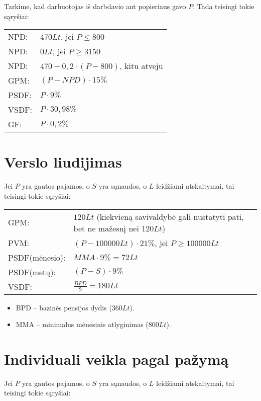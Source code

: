 Tarkime, kad darbuotojas iš darbdavio ant popieriaus gavo $P$. Tada
teisingi tokie sąryšiai:

\begin{tabularx}{15cm}{p{7.5cm}|p{7.5cm}}
  NPD: & $470 Lt$, jei $P \leq 800$ \\
  NPD: & $0 Lt$, jei $P \geq 3150$ \\
  NPD: & $470 - 0,2 \cdot (P - 800)$, kitu atveju \\
  GPM: & $(P - NPD) \cdot 15\%$ \\
  PSDF: & $P \cdot 9\%$ \\
  VSDF: & $P \cdot 30,98\%$ \\
  GF: & $P \cdot 0,2\%$ \\
\end{tabularx}

\section{Verslo liudijimas}

Jei $P$ yra gautos pajamos, o $S$ yra sąnaudos, o $L$ leidžiami
atskaitymai, tai teisingi tokie sąryšiai:

\begin{tabularx}{15cm}{p{7.5cm}|p{7.5cm}}
  GPM: & $120 Lt$ (kiekvieną savivaldybė gali nustatyti pati, bet ne
    mažesnį nei $120 Lt$) \\
  PVM: & $(P - 100 000 Lt) \cdot 21\%$, jei $P \geq 100 000 Lt$ \\
  PSDF(mėnesio): & $MMA \cdot 9\% = 72 Lt$ \\
  PSDF(metų): & $(P - S) \cdot 9\%$ \\
  VSDF: & $\frac{BPD}{2} = 180 Lt$ \\
\end{tabularx}

\begin{itemize}
  \item BPD – bazinės pensijos dydis ($360 Lt$).
  \item MMA – minimalus mėnesinis atlyginimas ($800Lt$).
\end{itemize}

\section{Individuali veikla pagal pažymą}

Jei $P$ yra gautos pajamos, o $S$ yra sąnaudos, o $L$ leidžiami
atskaitymai, tai teisingi tokie sąryšiai:

